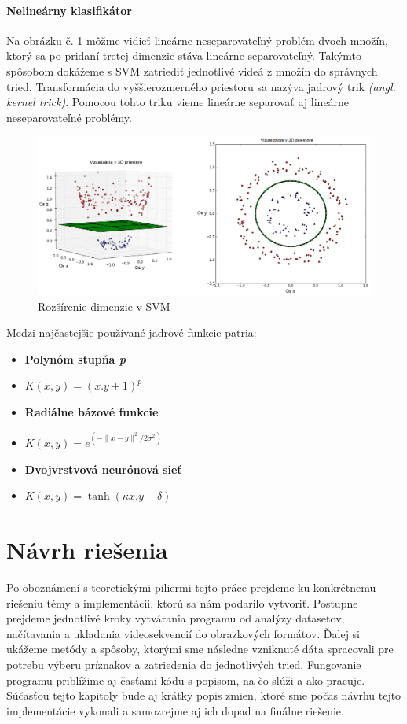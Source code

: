 \paragraph{Nelineárny klasifikátor}
Na obrázku č. \ref{SVMobr} môžme vidieť lineárne neseparovateľný problém dvoch množín, ktorý sa po pridaní tretej dimenzie stáva lineárne separovateľný. Takýmto spôsobom dokážeme s SVM zatriediť jednotlivé videá z množín do správnych tried. Transformácia do vyššierozmerného priestoru sa nazýva jadrový trik \textit{(angl. kernel trick)}. Pomocou tohto triku vieme lineárne separovať aj lineárne neseparovateľné problémy.\cite{c12}

\begin{figure}[!htbp]
  \centering
  \includegraphics[width=16cm]{img/SVM.png}
  \caption{Rozšírenie dimenzie v SVM}
  \label{SVMobr}
\end{figure}

Medzi najčastejšie používané jadrové funkcie patria:

\begin{itemize}
\item \textbf{Polynóm stupňa \textit{p}}
\item $  K(x,y) = (x.y + 1)^p $
\item \textbf{Radiálne bázové funkcie}
\item $   K(x,y) = e^{(-\|x-y\|^2/2\sigma^2)}  $
\item \textbf{Dvojvrstvová neurónová sieť }
\item $   K(x,y) = \tanh(\kappa x.y - \delta)  $
\end{itemize}

\section{Návrh riešenia}
Po oboznámení s teoretickými piliermi tejto práce prejdeme ku konkrétnemu riešeniu témy a implementácii, ktorú sa nám podarilo vytvoriť. Postupne prejdeme jednotlivé kroky vytvárania programu od analýzy datasetov, načítavania a ukladania videosekvencií do obrazkových formátov. Ďalej si ukážeme metódy a spôsoby, ktorými sme následne vzniknuté dáta spracovali pre potrebu výberu príznakov a zatriedenia do jednotlivých tried. Fungovanie programu priblížime aj časťami kódu s popisom, na čo slúži a ako pracuje. Súčasťou tejto kapitoly bude aj krátky popis zmien, ktoré sme počas návrhu tejto implementácie vykonali a samozrejme aj ich dopad na finálne riešenie.


